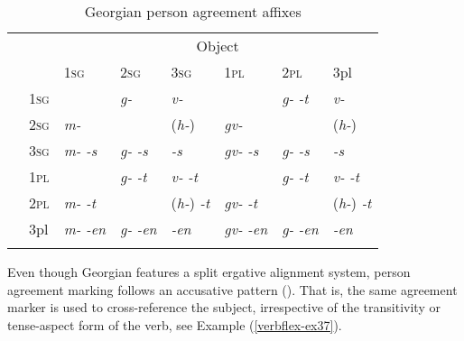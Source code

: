 \begin{table}
	\begin{tabular}{cllll lll}
    \lsptoprule
		& & \multicolumn{6}{c}{{Object}} \\ 
		& & \textsc{1sg} & \textsc{2sg} & \textsc{3sg} & \textsc{1pl} & \textsc{2pl} & \textsc{}3pl \\\cmidrule(lr){3-5}\cmidrule(lr){6-8}
		
		\multirow{6}{*}{\STAB{\rotatebox[origin=c]{90}{{Subject}}}}
		&  \textsc{1sg} & & \textit{g-} & \textit{v-} & & \textit{g-} \hfill \textit{-t} & \textit{v-} \\
		
		& \textsc{2sg}  & \textit{m-} & & (\textit{h-}) & \textit{gv-} & & (\textit{h-}) \\
		
		& \textsc{3sg}  & \textit{m-} \hfill \textit{-s} & \textit{g-} \hfill \textit{-s} & \hfill \textit{-s} & \textit{gv-} \hfill \textit{-s} & \textit{g-} \hfill \textit{-s} & \hfill \textit{-s} \\\cmidrule(lr){3-5}\cmidrule(lr){6-8}
		
		& \textsc{1pl}  &  & \textit{g-} \hfill \textit{-t} & \textit{v-} \hfill \textit{-t} & & \textit{g-} \hfill \textit{-t} & \textit{v-} \hfill \textit{-t} \\
		
		& \textsc{2pl}  & \textit{m-} \hfill \textit{-t} & &(\textit{h-}) \hfill \textit{-t} & \textit{gv-} \hfill \textit{-t} & & (\textit{h-}) \hfill \textit{-t} \\
		
		& \textsc{}3pl & \textit{m-} \hfill \textit{-en} & \textit{g-} \hfill \textit{-en} & \hfill \textit{-en} & \textit{gv-} \hfill \textit{-en} & \textit{g-} \hfill \textit{-en} & \hfill \textit{-en} \\
        \lspbottomrule
	\end{tabular}
	\caption{Georgian person agreement affixes}
	\label{verbalperson-table3}
\end{table} 

Even though Georgian features a split ergative alignment system, person agreement marking follows an accusative pattern (\cite[267]{aronson91}). That is, the same agreement marker is used to cross-reference the subject, irrespective of the transitivity or tense-aspect form of the verb, see Example (\ref{verbflex-ex37}).

